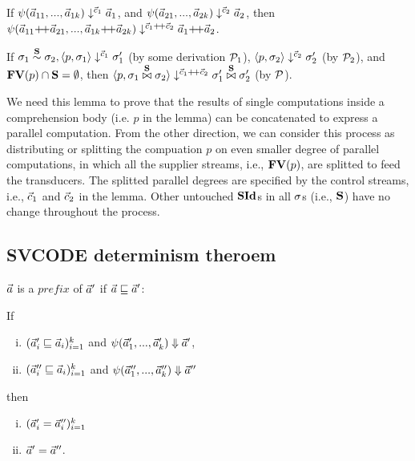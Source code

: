 %

\begin{lem} \label{lem-psi-join}
	If $\sevalfg{\lcall}{\a_{11},...,\a_{1k}}{\c_1}{\a_1}$,
	and $\sevalfg{\lcall}{\a_{21},...,\a_{2k}}{\c_2}{\a_2}$,
	then $\sevalfg{\lcall}{\a_{11} {\++} \a_{21},...,\a_{1k} {\++} \a_{2k}}{\c_1 {\++} \c_2}{\a_1 {\++} \a_2}$.
\end{lem}

\begin{lem} \label{lem-sgm-join}
	If $\sgm_1 \~{\S} \sgm_2, 
	\seval{p}{\sgm_1}{\c_1}{\sgm_1'}$ (by some derivation $\MP_1$),
	$\seval{p}{\sgm_2} {\c_2} {\sgm_2'}$ (by $\MP_2$),
	and $\FV{p} \cap \S = \emptyset $,
	then $\seval{p}{\sgm_1 \x\S \sgm_2}{\c_1 {\++} \c_2}{ \sgm_1' \x\S \sgm_2' }$ (by $\MP$).
\end{lem}

We need this lemma to prove that the results of single computations inside a comprehension body (i.e. $p$ in the lemma) can be concatenated to express a parallel computation. From the other direction, we can consider this process as distributing or splitting the compuation $p$ on even smaller degree of parallel computations, in which all the supplier streams, i.e., $\FV{p}$, are splitted to
feed the transducers. The splitted parallel degrees are specified by the
control streams, i.e., $\c_1$ and $\c_2$ in the lemma. Other untouched $\SId$s in all $\sgm$s (i.e., $\S$) have no change throughout the process.\\


\subsection{SVCODE determinism theroem}

\begin{defi}
	$\a$ is a $prefix$ of $\a'$ if $\a \prefix \a'$: \\
	\PT{\Axiom{\emptyv \prefix \a }}
	
\end{defi}


\begin{lem}
	If
	\begin{enumerate}[(i)]
		\item $(\a_i' \prefix  \a_i)^k_{i=1}$ and $\block{\a_1'}{\a_k'}{\a'}$, 
		\item $(\a_i'' \prefix \a_i)^k_{i=1}$ and
		$\block{\a_1''}{\a_k''}{\a''}$
	\end{enumerate} 
	then \begin{enumerate}[(i)]
		\item $(\a_i' = \a_i'')^k_{i=1}$ 
		\item $\a' = \a''$.
	\end{enumerate}
\end{lem}

